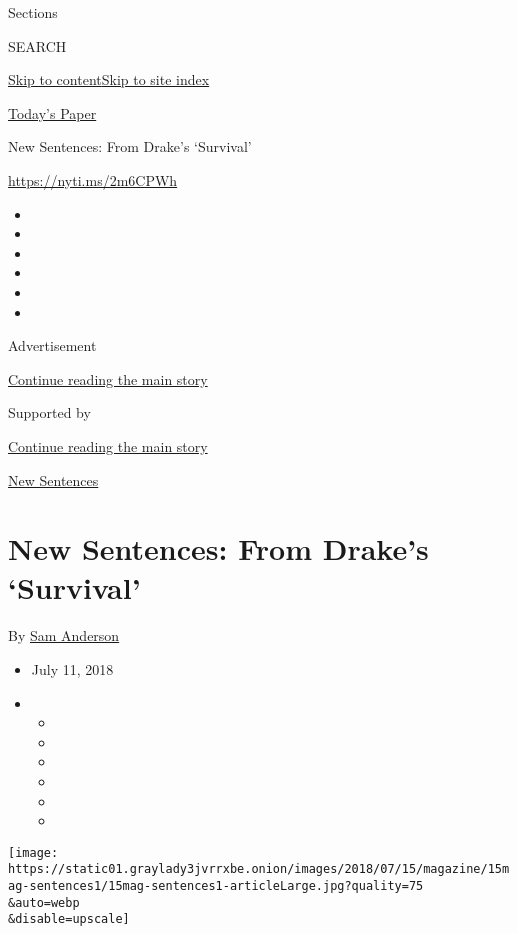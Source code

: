 Sections

SEARCH

\protect\hyperlink{site-content}{Skip to
content}\protect\hyperlink{site-index}{Skip to site index}

\href{https://myaccount.nytimes3xbfgragh.onion/auth/login?response_type=cookie\&client_id=vi}{}

\href{https://www.nytimes3xbfgragh.onion/section/todayspaper}{Today's
Paper}

New Sentences: From Drake's `Survival'

\url{https://nyti.ms/2m6CPWh}

\begin{itemize}
\item
\item
\item
\item
\item
\item
\end{itemize}

Advertisement

\protect\hyperlink{after-top}{Continue reading the main story}

Supported by

\protect\hyperlink{after-sponsor}{Continue reading the main story}

\href{/column/new-sentences}{New Sentences}

\hypertarget{new-sentences-from-drakes-survival}{%
\section{New Sentences: From Drake's
`Survival'}\label{new-sentences-from-drakes-survival}}

By \href{http://www.nytimes3xbfgragh.onion/by/sam-anderson}{Sam
Anderson}

\begin{itemize}
\item
  July 11, 2018
\item
  \begin{itemize}
  \item
  \item
  \item
  \item
  \item
  \item
  \end{itemize}
\end{itemize}

\texttt{[image: https://static01.graylady3jvrrxbe.onion/images/2018/07/15/magazine/15mag-sentences1/15mag-sentences1-articleLarge.jpg?quality=75\\\&auto=webp\\\&disable=upscale]}

